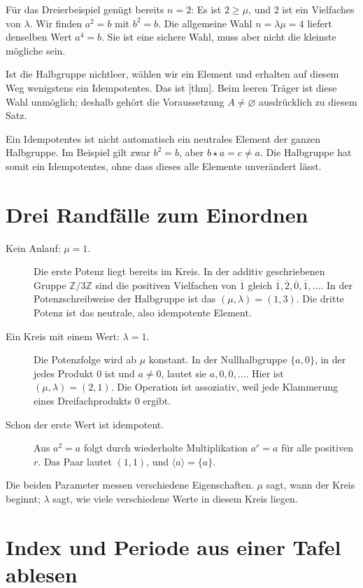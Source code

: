 Für das Dreierbeispiel genügt bereits \(n=2\):
Es ist \(2\geq\mu\), und \(2\) ist ein Vielfaches von \(\lambda\).
Wir finden \(a^2=b\) mit \(b^2=b\).
Die allgemeine Wahl \(n=\lambda\mu=4\) liefert denselben Wert
\(a^4=b\). Sie ist eine sichere Wahl, muss aber nicht die
kleinste mögliche sein.

Ist die Halbgruppe nichtleer, wählen wir ein Element und erhalten
auf diesem Weg wenigstens ein Idempotentes. Das ist
[thm].
Beim leeren Träger ist diese Wahl unmöglich; deshalb gehört die
Voraussetzung \(A\ne\varnothing\) ausdrücklich zu diesem Satz.

Ein Idempotentes ist nicht automatisch ein neutrales Element der
ganzen Halbgruppe. Im Beispiel gilt zwar \(b^2=b\), aber
\(b\star a=c\ne a\). Die Halbgruppe hat somit ein Idempotentes,
ohne dass dieses alle Elemente unverändert lässt.

\section*{Drei Randfälle zum Einordnen}

\begin{description}
 \item[Kein Anlauf: \(\mu=1\).]
 Die erste Potenz liegt bereits im Kreis. In der additiv
 geschriebenen Gruppe \(\mathbb Z/3\mathbb Z\) sind die positiven
 Vielfachen von \(\overline1\) gleich
 \(\overline1,\overline2,\overline0,\overline1,\ldots\).
 In der Potenzschreibweise der Halbgruppe ist das
 \((\mu,\lambda)=(1,3)\). Die dritte Potenz ist das neutrale,
 also idempotente Element.
 \item[Ein Kreis mit einem Wert: \(\lambda=1\).]
 Die Potenzfolge wird ab \(\mu\) konstant. In der Nullhalbgruppe
 \(\{a,0\}\), in der jedes Produkt \(0\) ist und \(a\ne0\),
 lautet sie \(a,0,0,\ldots\).
 Hier ist \((\mu,\lambda)=(2,1)\).
 Die Operation ist assoziativ, weil jede Klammerung eines
 Dreifachprodukts \(0\) ergibt.
 \item[Schon der erste Wert ist idempotent.]
 Aus \(a^2=a\) folgt durch wiederholte Multiplikation
 \(a^r=a\) für alle positiven \(r\).
 Das Paar lautet \((1,1)\), und \(\langle a\rangle=\{a\}\).
\end{description}

Die beiden Parameter messen verschiedene Eigenschaften.
\(\mu\) sagt, wann der Kreis beginnt; \(\lambda\) sagt,
wie viele verschiedene Werte in diesem Kreis liegen.

\section*{Index und Periode aus einer Tafel ablesen}

